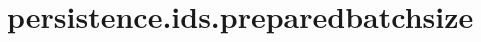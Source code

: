 \section{persistence.ids.preparedbatchsize}
\label{configuration:PersistenceIdsPreparedbatchsize}
\AvailableInJavaOnly{\TODO}